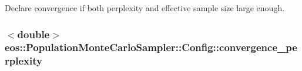 Declare convergence if both perplexity and effective sample size large enough. \hypertarget{structeos_1_1PopulationMonteCarloSampler_1_1Config_a42a627c391f5278eff3a1c1de7f06985}{
\subsubsection[{convergence\_\-perplexity}]{$<$double$>$ {\bf eos::PopulationMonteCarloSampler::Config::convergence\_\-perplexity}}}
\label{structeos_1_1PopulationMonteCarloSampler_1_1Config_a42a627c391f5278eff3a1c1de7f06985}


